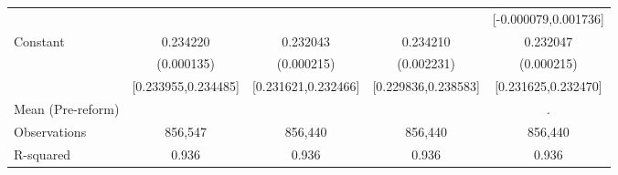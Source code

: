 {\begin{tabular}{l*{4}{c}}
                    &                     &                     &                     &[-0.000079,0.001736]         \\
Constant            &    0.234220\sym{***}&    0.232043\sym{***}&    0.234210\sym{***}&    0.232047\sym{***}\\
                    &  (0.000135)         &  (0.000215)         &  (0.002231)         &  (0.000215)         \\
                    &[0.233955,0.234485]         &[0.231621,0.232466]         &[0.229836,0.238583]         &[0.231625,0.232470]         \\
\midrule
Mean (Pre-reform)   &                     &                     &                     &           .         \\
Observations        &     856,547         &     856,440         &     856,440         &     856,440         \\
R-squared           &       0.936         &       0.936         &       0.936         &       0.936         \\
\bottomrule
\end{tabular}
}
